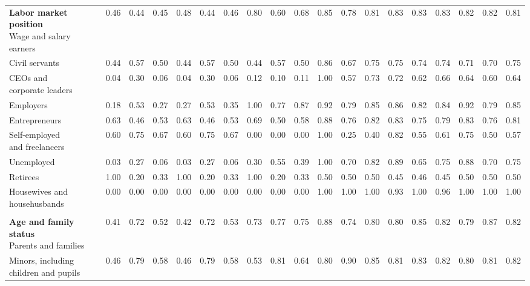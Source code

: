 \begin{table}[htb]
\begin{threeparttable}
\begin{tabular}{l ccc ccc ccc ccc ccc ccc}
\shortstack[l]{\textbf{Labor market position}\\[3pt]Wage and salary earners} & 0.46 & 0.44 & 0.45 & 0.48 & 0.44 & 0.46 & 0.80 & 0.60 & 0.68 & 0.85 & 0.78 & 0.81 & 0.83 & 0.83 & 0.83 & 0.82 & 0.82 & 0.81 \\
Civil servants & 0.44 & 0.57 & 0.50 & 0.44 & 0.57 & 0.50 & 0.44 & 0.57 & 0.50 & 0.86 & 0.67 & 0.75 & 0.75 & 0.74 & 0.74 & 0.71 & 0.70 & 0.75 \\
\shortstack[l]{CEOs and\\[-3pt]corporate leaders} & 0.04 & 0.30 & 0.06 & 0.04 & 0.30 & 0.06 & 0.12 & 0.10 & 0.11 & 1.00 & 0.57 & 0.73 & 0.72 & 0.62 & 0.66 & 0.64 & 0.60 & 0.64 \\
Employers & 0.18 & 0.53 & 0.27 & 0.27 & 0.53 & 0.35 & 1.00 & 0.77 & 0.87 & 0.92 & 0.79 & 0.85 & 0.86 & 0.82 & 0.84 & 0.92 & 0.79 & 0.85 \\
Entrepreneurs & 0.63 & 0.46 & 0.53 & 0.63 & 0.46 & 0.53 & 0.69 & 0.50 & 0.58 & 0.88 & 0.76 & 0.82 & 0.83 & 0.75 & 0.79 & 0.83 & 0.76 & 0.81 \\
\shortstack[l]{Self-employed\\[-3pt]and freelancers} & 0.60 & 0.75 & 0.67 & 0.60 & 0.75 & 0.67 & 0.00 & 0.00 & 0.00 & 1.00 & 0.25 & 0.40 & 0.82 & 0.55 & 0.61 & 0.75 & 0.50 & 0.57 \\
Unemployed & 0.03 & 0.27 & 0.06 & 0.03 & 0.27 & 0.06 & 0.30 & 0.55 & 0.39 & 1.00 & 0.70 & 0.82 & 0.89 & 0.65 & 0.75 & 0.88 & 0.70 & 0.75 \\
Retirees & 1.00 & 0.20 & 0.33 & 1.00 & 0.20 & 0.33 & 1.00 & 0.20 & 0.33 & 0.50 & 0.50 & 0.50 & 0.45 & 0.46 & 0.45 & 0.50 & 0.50 & 0.50 \\
\shortstack[l]{Housewives and\\[-3pt]househusbands} & 0.00 & 0.00 & 0.00 & 0.00 & 0.00 & 0.00 & 0.00 & 0.00 & 0.00 & 1.00 & 1.00 & 1.00 & 0.93 & 1.00 & 0.96 & 1.00 & 1.00 & 1.00 \\
\rule{0pt}{5pt} &  &  &  &  &  &  &  &  &  &  &  &  &  &  &  &  &  &  \\
\shortstack[l]{\textbf{Age and family status}\\[3pt]Parents and families} & 0.41 & 0.72 & 0.52 & 0.42 & 0.72 & 0.53 & 0.73 & 0.77 & 0.75 & 0.88 & 0.74 & 0.80 & 0.80 & 0.85 & 0.82 & 0.79 & 0.87 & 0.82 \\
\shortstack[l]{Minors, including\\[-3pt]children and pupils} & 0.46 & 0.79 & 0.58 & 0.46 & 0.79 & 0.58 & 0.53 & 0.81 & 0.64 & 0.80 & 0.90 & 0.85 & 0.81 & 0.83 & 0.82 & 0.80 & 0.81 & 0.82 \\

\end{tabular}
\end{threeparttable}
\end{table}
